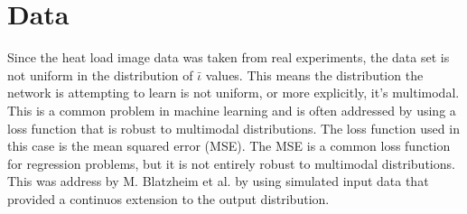 
\chapter{Data}
\label{sec:Head Load Data}


Since the heat load image data was taken from real experiments, the data set is not uniform in the distribution of $\bar{\iota}$ values. This means the distribution the network is attempting to learn is not uniform, or more explicitly, it's multimodal. This is a common problem in machine learning and is often addressed by using a loss function that is robust to multimodal distributions. The loss function used in this case is the mean squared error (MSE). The MSE is a common loss function for regression problems, but it is not entirely robust to multimodal distributions. This was address by M. Blatzheim et al. \cite{Blatzheim_2018} by using simulated input data that provided a continuos extension to the output distribution.